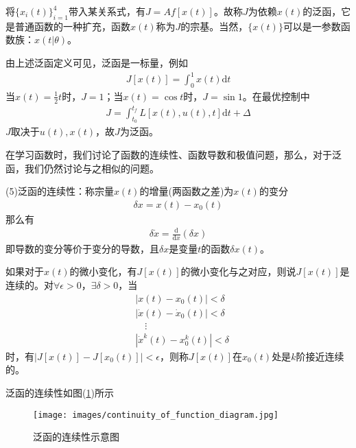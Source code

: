             将$\{x_i(t)\}_{i=1}^4$带入某关系式，有$J = Af[x(t)]$。故称$J$为依赖$x(t)$的泛函，它是普通函数的一种扩充，函数$x(t)$称为$J$的宗基。当然，$\{x(t)\}$可以是一参数函数族：$x(t|\theta)$。
            \par
            由上述泛函定义可见，泛函是一标量，例如
            \begin{align*}
            J[x(t)] = \int_0^1x(t)\mathrm{d}t
            \end{align*}
            当$x(t) = \frac{1}{2}t$时，$J=1$；当$x(t) = \cos t$时，$J = \sin 1$。在最优控制中
            \begin{align*}
            J = \int_{t_0}^{t_f}L[x(t),u(t),t]\mathrm{d}t + \Delta
            \end{align*}
            $J$取决于$u(t),x(t)$，故$J$为泛函。
            \par
            在学习函数时，我们讨论了函数的连续性、函数导数和极值问题，那么，对于泛函，我们仍然讨论与之相似的问题。
            \par
            (5)泛函的连续性：称宗量$x(t)$的增量(两函数之差)为$x(t)$的变分
            \begin{align*}
            \delta x = x(t) - x_0(t)
            \end{align*}
            那么有
            \begin{align*}
            \delta\dot{x} = \frac{\mathrm{d}}{\mathrm{d}x} (\delta x)
            \end{align*}
            即导数的变分等价于变分的导数，且$\delta x$是变量$t$的函数$\delta x(t)$。
            \begin{definition}[泛函的连续性]
            如果对于$x(t)$的微小变化，有$J[x(t)]$的微小变化与之对应，则说$J[x(t)]$是连续的。对$\forall \epsilon >0$，$\exists \delta >0$，当
            \begin{align*}
            & |x(t) - x_0(t)| < \delta\\
            & | \dot{x}(t) - \dot{x}_0(t) |<\delta\\
            & \quad \vdots\\
            & | \dot{x}^k(t) - x_0^k(t) | < \delta
            \end{align*}
            时，有$|J[x(t)] - J[x_0(t)]  |<\epsilon$，则称$J[x(t)]$在$x_0(t)$处是$k$阶接近连续的。
            \end{definition}
            \par
            泛函的连续性如图(\ref{fig:泛函的连续性示意图})所示
            \begin{figure}[H]
            \centering
            \texttt{[image: images/continuity\_of\_function\_diagram.jpg]}
            \caption{泛函的连续性示意图}
            \label{fig:泛函的连续性示意图}
            \end{figure}
